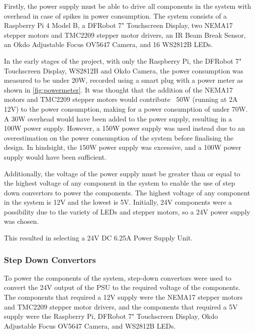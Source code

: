 Firstly, the power supply must be able to drive all components in the system with overhead in case of spikes in power consumption. The system consists of a Raspberry Pi 4 Model B, a DFRobot 7" Touchscreen Display, two NEMA17 stepper motors and TMC2209 stepper motor drivers, an IR Beam Break Sensor, an Okdo Adjustable Focus OV5647 Camera, and 16 WS2812B LEDs. 

In the early stages of the project, with only the Raspberry Pi, the DFRobot 7" Touchscreen Display, WS2812B and Okdo Camera, the power consumption was measured to be under 20W, recorded using a smart plug with a power meter as shown in \autoref{fig:powermeter}. It was thought that the addition of the NEMA17 motors and TMC2209 stepper motors would contribute ~50W (running at 2A 12V) to the power consumption, making for a power consumption of under 70W. A 30W overhead would have been added to the power supply, resulting in a 100W power supply. However, a 150W power supply was used instead due to an overestimation on the power consumption of the system before finalising the design. In hindsight, the 150W power supply was excessive, and a 100W power supply would have been sufficient.


Additionally, the voltage of the power supply must be greater than or equal to the highest voltage of any component in the system to enable the use of step down convertors to power the components. The highest voltage of any component in the system is 12V and the lowest is 5V. Initially, 24V components were a possibility due to the variety of LEDs and stepper motors, so a 24V power supply was chosen.

This resulted in selecting a 24V DC 6.25A Power Supply Unit.

\subsubsection{Step Down Convertors}
To power the components of the system, step-down convertors were used to convert the 24V output of the PSU to the required voltage of the components. The components that required a 12V supply were the NEMA17 stepper motors and TMC2209 stepper motor drivers, and the components that required a 5V supply were the Raspberry Pi, DFRobot 7" Touchscreen Display, Okdo Adjustable Focus OV5647 Camera, and WS2812B LEDs.

